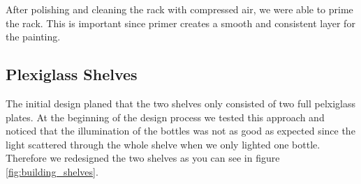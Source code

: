 \documentclass{acm_proc_article-sp}
\begin{document}
After polishing and cleaning the rack with compressed air, we were able to prime the rack. This is important since primer creates a smooth and consistent layer for the painting.


\subsection{Plexiglass Shelves}

\begin{minipage}{\linewidth}%
\label{fig:building_shelves}%
\end{minipage}

The initial design planed that the two shelves only consisted of two full pelxiglass plates. At the beginning of the design process we tested this approach and noticed that the illumination of the bottles was not as good as expected since the light scattered through the whole shelve when we only lighted one bottle. Therefore we redesigned the two shelves as you can see in figure \ref{fig:building_shelves}. 

\begin{minipage}{\linewidth}%
\label{fig:illuminated_shelves}%
\end{minipage}
\end{document}
